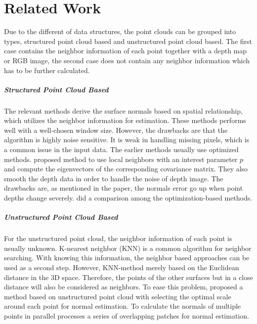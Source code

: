 
\chapter{Related Work} %

\label{ch:02} %


Due to the different of data structures, the point clouds can be grouped into types, structured point cloud based and unstructured point cloud based. The first case contains the neighbor information of each point together with a depth map or RGB image, the second case does not contain any neighbor information which has to be further calculated.

\paragraph{ Structured Point Cloud Based}
The relevant methods derive the surface normals based on spatial relationship, which utilizes the neighbor information for estimation. These methods performs well with a well-chosen window size. However, the drawbacks are that the algorithm is highly noise sensitive. It is weak in handling missing pixels, which is a common issue in the input data. The earlier methods usually use optimized methods. \cite{Holzer.S} proposed method to use local neighbors with an interest parameter $ p $ and compute the eigenvectors of the corresponding covariance matrix. They also smooth the depth data in order to handle the noise of depth image. The drawbacks are, as mentioned in the paper, the normals error go up when point depths change severely.  \cite{optimized-methods} did a comparison among the optimization-based methods. 


\paragraph{Unstructured Point Cloud Based}
For the unstructured point cloud, the neighbor information of each point is usually unknown. K-nearest neighbor (KNN) is a common algorithm for neighbor searching. With knowing this information, the neighbor based approaches can be used as a second step. However, KNN-method merely based on the Euclidean distance in the 3D space. Therefore, the points of the other surfaces but in a close distance will also be considered as neighbors. To ease this problem, \cite{unstructed-pc} proposed a method based on unstructured point cloud with selecting the optimal scale around each point for normal estimation. To calculate the normals of multiple points in parallel \cite{unstructed-pc-patch-stitching} processes a series of overlapping patches for normal estimation. 



